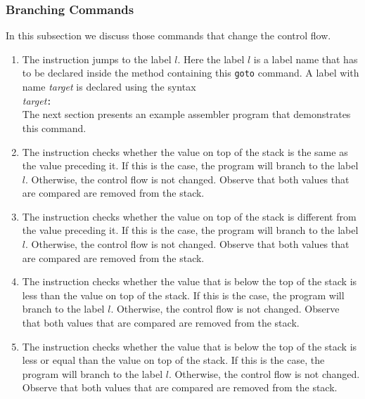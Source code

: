 \subsubsection{Branching Commands}
In this subsection we discuss those commands that change the control flow.
\begin{enumerate}
\item The instruction 
      jumps to the label $l$.  Here the label $l$ is a label name that has to be declared inside the
      method containing this \texttt{goto} command.  A label with name \textsl{target} is declared using the syntax
      \\[0.2cm]
      \hspace*{1.3cm}
      \textsl{target}\texttt{:}
      \\[0.2cm]
      The next section presents an example assembler program that demonstrates this command.
\item The instruction 
      checks whether the value on top of the stack is the same as the value preceding it.  If this is
      the case, the program will branch 
      to the label $l$.  Otherwise, the control flow is not changed.  Observe that both values that are
      compared are removed from the stack.
\item The instruction 
      checks whether the value on top of the stack is different from the value preceding it.  If this is
      the case, the program will branch to the label $l$.  Otherwise, the control flow is not
      changed.  Observe that both values that are compared are removed from the stack.

\item The instruction 
      checks whether the value that is below the top of the stack is less than the value on top of
      the stack.  If this is the case, the program will branch 
      to the label $l$.  Otherwise, the control flow is not changed.  Observe that both values that are
      compared are removed from the stack.

\item The instruction 
      checks whether the value that is below the top of the stack is less or equal than the value on top
      of the stack.  If this is the case, the program will branch 
      to the label $l$.  Otherwise, the control flow is not changed.  Observe that both values that are
      compared are removed from the stack.
      

\end{enumerate}
